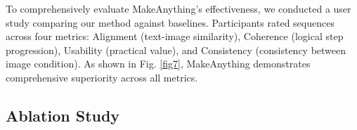 To comprehensively evaluate MakeAnything's effectiveness, we conducted a user study comparing our method against baselines. Participants rated sequences across four metrics: Alignment (text-image similarity), Coherence (logical step progression), Usability (practical value), and Consistency (consistency between image condition). As shown in Fig. \ref{fig7}, MakeAnything demonstrates comprehensive superiority across all metrics. 





\subsection{Ablation Study} 


